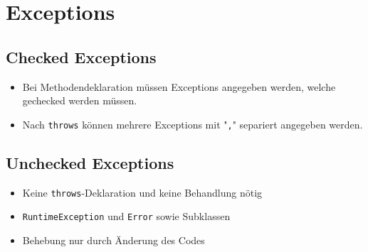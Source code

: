 \section{Exceptions}

\begin{minipage}[t]{0.43\columnwidth}
    \subsection{Checked Exceptions}
    \raggedright%
    \begin{itemize}
        \item Bei Methodendeklaration müssen Exceptions angegeben werden, welche gechecked werden müssen.
    \end{itemize}
\end{minipage}\hfill%
\begin{minipage}[t]{0.56\columnwidth}
    
\end{minipage}
\begin{itemize}
    \item Nach \lstinline{throws} können mehrere Exceptions mit "\lstinline{,}" separiert angegeben werden.
\end{itemize}
\vspace{-0.4\abovedisplayskip}
\begin{minipage}[t]{0.44\columnwidth}
    \subsection{Unchecked Exceptions}
    \raggedright%
    \begin{itemize}
        \item Keine \lstinline{throws}-Deklaration und keine Behandlung nötig
        \item \lstinline{RuntimeException} und \lstinline{Error} sowie Subklassen
        \item Behebung nur durch Änderung des Codes
    \end{itemize}
\end{minipage}\hfill%
\begin{minipage}[t]{0.55\columnwidth}
    
\end{minipage}

